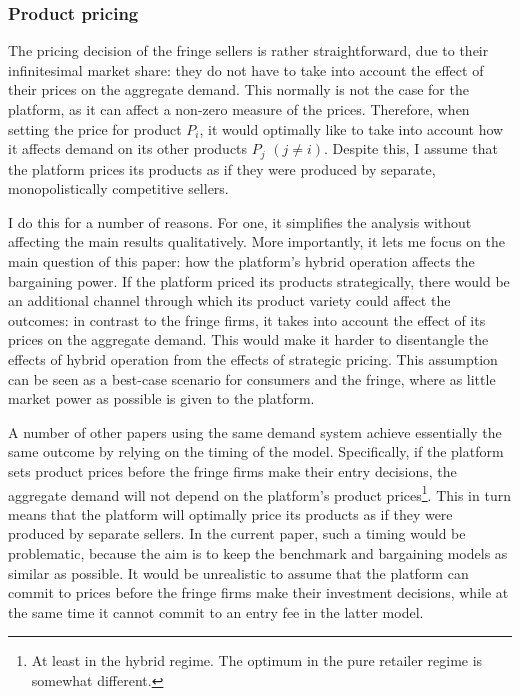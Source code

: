 \documentclass[a4paper]{article}
\begin{document}
\subsubsection{Product pricing}

The pricing decision of the fringe sellers is rather straightforward, due to their infinitesimal market share: they do not have to take into account the effect of their prices on the aggregate demand.
This normally is not the case for the platform, as it can affect a non-zero measure of the prices.
Therefore, when setting the price for product $P_i$, it would optimally like to take into account how it affects demand on its other products $P_j$ $(j \neq i)$.
Despite this, I assume that the platform prices its products as if they were produced by separate, monopolistically competitive sellers.

I do this for a number of reasons.
For one, it simplifies the analysis without affecting the main results qualitatively.
More importantly, it lets me focus on the main question of this paper: how the platform's hybrid operation affects the bargaining power.
If the platform priced its products strategically, there would be an additional channel through which its product variety could affect the outcomes: in contrast to the fringe firms, it takes into account the effect of its prices on the aggregate demand.
This would make it harder to disentangle the effects of hybrid operation from the effects of strategic pricing.
This assumption can be seen as a best-case scenario for consumers and the fringe, where as little market power as possible is given to the platform.

A number of other papers using the same demand system \parencite[e.g.][]{anderson2020aggregative,anderson2021hybrid} achieve essentially the same outcome by relying on the timing of the model.
Specifically, if the platform sets product prices before the fringe firms make their entry decisions, the aggregate demand will not depend on the platform's product prices\footnote{
    At least in the hybrid regime.
    The optimum in the pure retailer regime is somewhat different.
}.
This in turn means that the platform will optimally price its products as if they were produced by separate sellers.
In the current paper, such a timing would be problematic, because the aim is to keep the benchmark and bargaining models as similar as possible.
It would be unrealistic to assume that the platform can commit to prices before the fringe firms make their investment decisions, while at the same time it cannot commit to an entry fee in the latter model.
\end{document}
